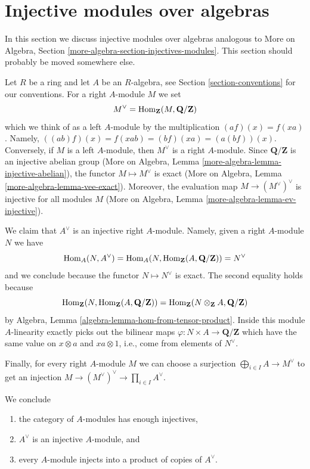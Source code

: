 \section{Injective modules over algebras}
\label{section-modules-noncommutative}

\noindent
In this section we discuss injective modules over algebras
analogous to
More on Algebra, Section \ref{more-algebra-section-injectives-modules}.
This section should probably be moved somewhere else.

\medskip\noindent
Let $R$ be a ring and let $A$ be an
$R$-algebra, see Section \ref{section-conventions} for our conventions.
For a right $A$-module $M$ we set
$$
M^\vee = \mathop{\mathrm{Hom}}\nolimits_\mathbf{Z}(M, \mathbf{Q}/\mathbf{Z})
$$
which we think of as a left $A$-module by the multiplication
$(a f)(x) = f(xa)$. Namely, $((ab)f)(x) = f(xab) = (bf)(xa) = (a(bf))(x)$.
Conversely, if $M$ is a left $A$-module, then $M^\vee$ is a right
$A$-module. Since $\mathbf{Q}/\mathbf{Z}$ is an injective abelian
group (More on Algebra, Lemma \ref{more-algebra-lemma-injective-abelian}), the
functor $M \mapsto M^\vee$ is exact
(More on Algebra, Lemma \ref{more-algebra-lemma-vee-exact}).
Moreover, the evaluation map $M \to (M^\vee)^\vee$ is
injective for all modules $M$
(More on Algebra, Lemma \ref{more-algebra-lemma-ev-injective}).

\medskip\noindent
We claim that $A^\vee$ is an injective right $A$-module. Namely, given
a right $A$-module $N$ we have
$$
\mathop{\mathrm{Hom}}\nolimits_A(N, A^\vee) =
\mathop{\mathrm{Hom}}\nolimits_A(N, \mathop{\mathrm{Hom}}\nolimits_\mathbf{Z}(A, \mathbf{Q}/\mathbf{Z})) = N^\vee
$$
and we conclude because the functor $N \mapsto N^\vee$ is exact.
The second equality holds because
$$
\mathop{\mathrm{Hom}}\nolimits_\mathbf{Z}(N, \mathop{\mathrm{Hom}}\nolimits_\mathbf{Z}(A, \mathbf{Q}/\mathbf{Z})) =
\mathop{\mathrm{Hom}}\nolimits_\mathbf{Z}(N \otimes_\mathbf{Z} A, \mathbf{Q}/\mathbf{Z})
$$
by Algebra, Lemma \ref{algebra-lemma-hom-from-tensor-product}.
Inside this module $A$-linearity exactly picks out the bilinear maps
$\varphi : N \times A \to \mathbf{Q}/\mathbf{Z}$ which
have the same value on $x \otimes a$ and $xa \otimes 1$, i.e.,
come from elements of $N^\vee$.

\medskip\noindent
Finally, for every right $A$-module $M$ we can choose a surjection
$\bigoplus_{i \in I} A \to M^\vee$ to get an injection
$M \to (M^\vee)^\vee \to \prod_{i \in I} A^\vee$.

\medskip\noindent
We conclude
\begin{enumerate}
\item the category of $A$-modules has enough injectives,
\item $A^\vee$ is an injective $A$-module, and
\item every $A$-module injects into a product of copies of $A^\vee$.
\end{enumerate}





